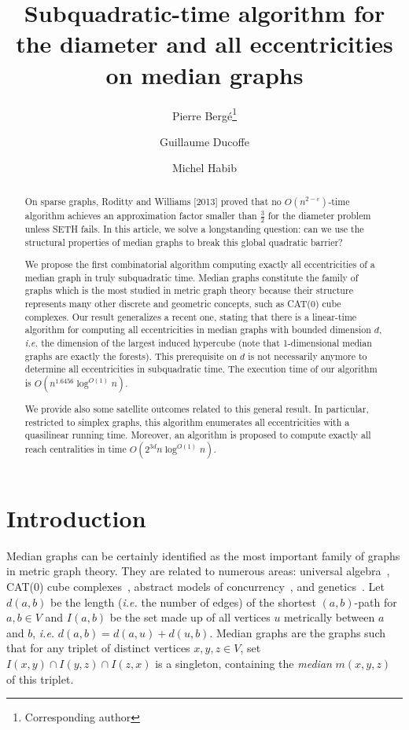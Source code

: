 \documentclass[a4paper,UKenglish,numberwithinsect,cleveref, autoref]{lipics-v2021}
\title{Subquadratic-time algorithm for the diameter and all eccentricities on median graphs}
\author{Pierre Berg\'e\footnote{Corresponding author}}{Univ Lyon, CNRS, ENS de Lyon, Universit\'e Claude Bernard Lyon 1, LIP, France \and IRIF, CNRS, Universit\'e de Paris, France}{}{}{}
\author{Guillaume {Ducoffe}}{National Institute for Research and Development in Informatics, Romania \and University of Bucharest, Romania}{}{}{}
\author{Michel {Habib}}{IRIF, CNRS, Universit\'e de Paris, France}{}{}{}
\begin{document}
\maketitle

\begin{abstract}
On sparse graphs, Roditty and Williams [2013] proved that no $O(n^{2-\varepsilon})$-time algorithm achieves an approximation factor smaller than $\frac{3}{2}$ for the diameter problem unless SETH fails.
In this article, we solve a longstanding question: can we use the structural properties of median graphs to break this global quadratic barrier?

We propose the first combinatorial algorithm computing exactly all eccentricities of a median graph in truly subquadratic time. Median graphs constitute the family of graphs which is the most studied in metric graph theory because their structure represents many other discrete and geometric concepts, such as CAT(0) cube complexes. Our result generalizes a recent one, stating that there is a linear-time algorithm for computing all eccentricities in median graphs with bounded dimension $d$, {\em i.e.} the dimension of the largest induced hypercube (note that 1-dimensional median graphs are exactly the forests). This prerequisite on $d$ is not necessarily anymore to determine all eccentricities in subquadratic time. The execution time of our algorithm is $O(n^{1.6456}\log^{O(1)} n)$.

We provide also some satellite outcomes related to this general result. In particular, restricted to simplex graphs, this algorithm enumerates all eccentricities with a quasilinear running time. Moreover, an algorithm is proposed to compute exactly all reach centralities in time $O(2^{3d}n\log^{O(1)}n)$.
\end{abstract}

\newpage

\section{Introduction} \label{sec:intro}

Median graphs can be certainly identified as the most important family of graphs in metric graph theory. They are related to numerous areas: universal algebra~\cite{Av61,BiKi47}, CAT(0) cube complexes~\cite{BaCh08,Ch00}, abstract models of concurrency~\cite{BaCo93,SaNiWi93}, and genetics~\cite{BaQuSaMa02,BaFoSyRi95}. Let $d(a,b)$ be the length ({\em i.e.} the number of edges) of the shortest $(a,b)$-path for $a,b \in V$ and $I(a,b)$ be the set made up of all vertices $u$ metrically between $a$ and $b$, {\em i.e.} $d(a,b) = d(a,u) + d(u,b)$. Median graphs are the graphs such that for any triplet of distinct vertices $x,y,z \in V$, set $I(x,y) \cap I(y,z) \cap I(z,x)$ is a singleton, containing the \textit{median} $m(x,y,z)$ of this triplet.
\end{document}
